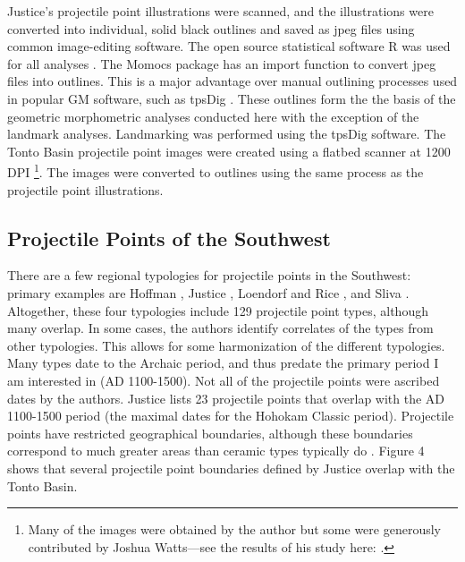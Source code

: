 \documentclass[letterpaper]{article}
\begin{document}
Justice's projectile point illustrations were scanned, and the illustrations were converted into individual, solid black outlines and saved as jpeg files using common image-editing software. The open source statistical software R was used for all analyses \autocite{R_Core_Team2022-wb}. The Momocs package \autocite{Bonhomme2014-gt} has an import function to convert jpeg files into outlines. This is a major advantage over manual outlining processes used in popular GM software, such as tpsDig \autocite{James_Rohlf2015-ui}. These outlines form the the basis of the geometric morphometric analyses conducted here with the exception of the landmark analyses. Landmarking was performed using the tpsDig software. The Tonto Basin projectile point images were created using a flatbed scanner at 1200 DPI \footnote{Many of the images were obtained by the author but some were generously contributed by Joshua Watts---see the results of his study here: \autocite{Watts2013-ub}.}. The images were converted to outlines using the same process as the projectile point illustrations.

\hypertarget{projectile-points-of-the-southwest}{%
\subsection*{Projectile Points of the Southwest}\label{projectile-points-of-the-southwest}}

There are a few regional typologies for projectile points in the Southwest: primary examples are Hoffman \autocite*{Hoffman1997-hb}, Justice \autocite*{Justice2002-cf}, Loendorf and Rice \autocite*{Loendorf2004-tp}, and Sliva \autocite*{Sliva2006-nq}. Altogether, these four typologies include 129 projectile point types, although many overlap. In some cases, the authors identify correlates of the types from other typologies. This allows for some harmonization of the different typologies. Many types date to the Archaic period, and thus predate the primary period I am interested in (AD 1100-1500). Not all of the projectile points were ascribed dates by the authors. Justice lists 23 projectile points that overlap with the AD 1100-1500 period (the maximal dates for the Hohokam Classic period). Projectile points have restricted geographical boundaries, although these boundaries correspond to much greater areas than ceramic types typically do \autocite{Buchanan2019-vn}. Figure 4 shows that several projectile point boundaries defined by Justice overlap with the Tonto Basin.
\end{document}
